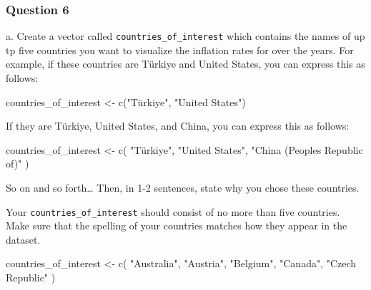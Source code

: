 \documentclass[
  letterpaper,
  DIV=11,
  numbers=noendperiod]{scrartcl}
\newenvironment{Shaded}{\begin{snugshade}}{\end{snugshade}}
\newcommand{\FunctionTok}[1]{\textcolor[rgb]{0.28,0.35,0.67}{#1}}
\newcommand{\NormalTok}[1]{\textcolor[rgb]{0.00,0.23,0.31}{#1}}
\newcommand{\OtherTok}[1]{\textcolor[rgb]{0.00,0.23,0.31}{#1}}
\newcommand{\StringTok}[1]{\textcolor[rgb]{0.13,0.47,0.30}{#1}}
\begin{document}
\subsubsection{Question 6}\label{question-6}

a. Create a vector called \texttt{countries\_of\_interest} which
contains the names of up tp five countries you want to visualize the
inflation rates for over the years. For example, if these countries are
Türkiye and United States, you can express this as follows:

\begin{Shaded}
\begin{Highlighting}[]
\NormalTok{countries\_of\_interest }\OtherTok{\textless{}{-}} \FunctionTok{c}\NormalTok{(}\StringTok{"Türkiye"}\NormalTok{, }\StringTok{"United States"}\NormalTok{)}
\end{Highlighting}
\end{Shaded}

If they are Türkiye, United States, and China, you can express this as
follows:

\begin{Shaded}
\begin{Highlighting}[]
\NormalTok{countries\_of\_interest }\OtherTok{\textless{}{-}} \FunctionTok{c}\NormalTok{(}
  \StringTok{"Türkiye"}\NormalTok{, }\StringTok{"United States"}\NormalTok{, }\StringTok{"China (People\textquotesingle{}s Republic of)"}
\NormalTok{)}
\end{Highlighting}
\end{Shaded}

So on and so forth\ldots{} Then, in 1-2 sentences, state why you chose
these countries.

\begin{tcolorbox}[enhanced jigsaw, toptitle=1mm, bottomrule=.15mm, colbacktitle=quarto-callout-note-color!10!white, colframe=quarto-callout-note-color-frame, leftrule=.75mm, breakable, toprule=.15mm, colback=white, arc=.35mm, coltitle=black, left=2mm, opacitybacktitle=0.6, bottomtitle=1mm, opacityback=0, title=\textcolor{quarto-callout-note-color}{\faInfo}\hspace{0.5em}{Note}, titlerule=0mm, rightrule=.15mm]

Your \texttt{countries\_of\_interest} should consist of no more than
five countries. Make sure that the spelling of your countries matches
how they appear in the dataset.

\end{tcolorbox}

\begin{Shaded}
\begin{Highlighting}[]
\NormalTok{countries\_of\_interest }\OtherTok{\textless{}{-}} \FunctionTok{c}\NormalTok{(}
  \StringTok{"Australia"}\NormalTok{,}
  \StringTok{"Austria"}\NormalTok{,}
  \StringTok{"Belgium"}\NormalTok{,}
  \StringTok{"Canada"}\NormalTok{,}
  \StringTok{"Czech Republic"}
\NormalTok{)}
\end{Highlighting}
\end{Shaded}
\end{document}
